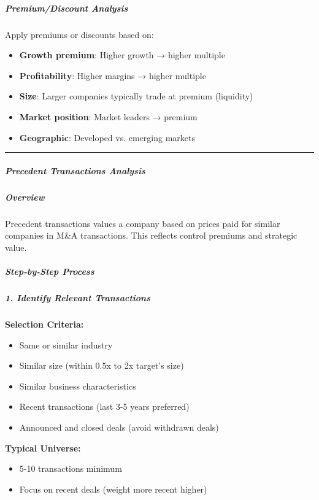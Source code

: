 \documentclass[11pt]{article}
\begin{document}
\subparagraph{Premium/Discount Analysis}\mbox{}\par

Apply premiums or discounts based on:

\begin{itemize}[leftmargin=*,itemsep=2pt,topsep=2pt]
\item {} \textbf{Growth premium}: Higher growth → higher multiple
\item {} \textbf{Profitability}: Higher margins → higher multiple
\item {} \textbf{Size}: Larger companies typically trade at premium (liquidity)
\item {} \textbf{Market position}: Market leaders → premium
\item {} \textbf{Geographic}: Developed vs. emerging markets
\end{itemize}

\vspace{0.5em}\hrule\vspace{0.5em}

\subparagraph{Precedent Transactions Analysis}\mbox{}\par

\subparagraph{Overview}\mbox{}\par

Precedent transactions values a company based on prices paid for similar companies in M\&A transactions. This reflects control premiums and strategic value.


\subparagraph{Step-by-Step Process}\mbox{}\par

\subparagraph{1. Identify Relevant Transactions}\mbox{}\par

\textbf{Selection Criteria:}

\begin{itemize}[leftmargin=*,itemsep=2pt,topsep=2pt]
\item {} Same or similar industry
\item {} Similar size (within 0.5x to 2x target's size)
\item {} Similar business characteristics
\item {} Recent transactions (last 3-5 years preferred)
\item {} Announced and closed deals (avoid withdrawn deals)
\end{itemize}

\textbf{Typical Universe:}

\begin{itemize}[leftmargin=*,itemsep=2pt,topsep=2pt]
\item {} 5-10 transactions minimum
\item {} Focus on recent deals (weight more recent higher)
\end{itemize}
\end{document}
